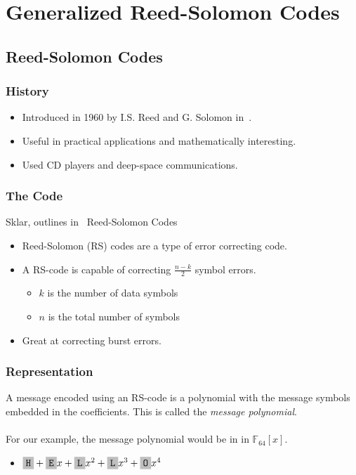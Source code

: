 \documentclass{beamer}
\begin{document}
\section{Generalized Reed-Solomon Codes}

\subsection{Reed-Solomon Codes}

\begin{frame}
	\frametitle{History}
	\begin{itemize}
		\item Introduced in 1960 by I.S. Reed and G. Solomon in~\cite{RS:1960}.
		\item Useful in practical applications and mathematically interesting.
		\item Used CD players and deep-space communications.
	\end{itemize}
\end{frame}

\begin{frame}
	\frametitle{The Code}
	Sklar, outlines in~\cite{Sklar:2001} Reed-Solomon Codes
	\begin{itemize}
		\item Reed-Solomon (RS) codes are a type of error correcting code.
		\item A RS-code is capable of correcting $\frac{n - k}{2}$ symbol errors. 
		\begin{itemize}
		 \item $k$ is the number of data symbols
		 \item $n$ is the total number of symbols
		\end{itemize}
		\item Great at correcting burst errors.
	\end{itemize}
\end{frame}

\begin{frame}
	\frametitle{Representation}
	A message encoded using an RS-code is a polynomial with the message symbols embedded in the coefficients. This is called the \textit{message polynomial}.\\~\\
	
	For our example, the message polynomial would be in in $\mathbb{F}_{64}[x]$.
	\begin{itemize}
		\item $\f{H} + \f{E}x + \f{L}x^{2} + \f{L}x^{3} + \f{O}x^{4}$
	\end{itemize}	
	

\end{frame}
\end{document}
